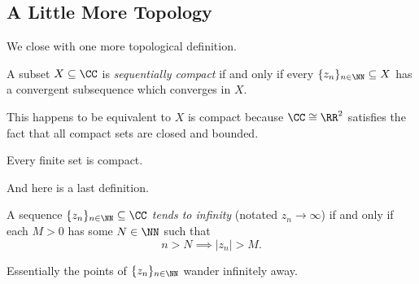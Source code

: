 \documentclass[../notes.tex]{subfiles}
\begin{document}
\subsection{A Little More Topology}
We close with one more topological definition.
\begin{definition}
	A subset $X\subseteq\CC$ is \textit{sequentially compact} if and only if every $\{z_n\}_{n\in\NN}\subseteq X$ has a convergent subsequence which converges in $X$.
\end{definition}
\begin{remark}
	This happens to be equivalent to $X$ is compact because $\CC\cong\RR^2$ satisfies the fact that all compact sets are closed and bounded.
\end{remark}
\begin{example}
	Every finite set is compact.
\end{example}
And here is a last definition.
\begin{definition}
	A sequence $\{z_n\}_{n\in\NN}\subseteq\CC$ \textit{tends to infinity} (notated $z_n\to\infty$) if and only if each $M>0$ has some $N\in\NN$ such that
	\[n>N\implies|z_n|>M.\]
\end{definition}
Essentially the points of $\{z_n\}_{n\in\NN}$ wander infinitely away.
\end{document}
